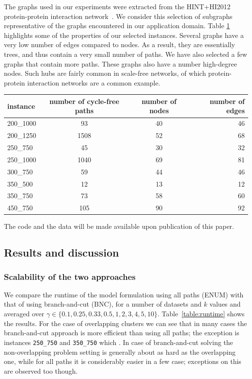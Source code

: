 \documentclass[conference]{IEEEtran}
\newcommand{\NDT}[1]{\todo[bordercolor=ghue,linecolor=ghue,color=ghue!40]{Tias: #1}}
\begin{document}
The graphs used in our experiments were extracted from the HINT+HI2012 protein-protein interaction network~\cite{das2012hint,yu2011next}. We consider this selection of subgraphs representative of the graphs encountered in our application domain. Table \ref{table:instanceInformation} highlights some of the properties of our selected instances. Several graphs have a very low number of edges compared to nodes. As a result, they are essentially trees, and thus contain a very small number of paths. 
We have also selected a few graphs that contain more paths. These graphs also have a number high-degree nodes. Such hubs are fairly common in scale-free networks, of which protein-protein interaction networks are a common example.


%


\begin{table}
\centering
\captionsetup{font=small}
\label{table:instanceInformation}
\begin{tabular}{|l c c r|}
\hline
instance & number of cycle-free paths & number of nodes & number of edges\\
\hline
200\_1000 & 93 & 40 & 46\\
200\_1250 & 1508 & 52 & 68\\
250\_750 & 45 & 30 & 32\\
250\_1000 & 1040 & 69 & 81\\
300\_750 & 59 & 44 & 46\\
350\_500 & 12 & 13 & 12\\
350\_750 & 73 & 58 & 60\\
450\_750 & 105 & 90 & 92\\
\hline
\end{tabular}
\end{table}


The code and the data will be made available upon publication of this paper.

\subsection{Results and discussion}
\subsubsection{Scalability of the two approaches}
We compare the runtime of the model formulation using all paths (ENUM) with that of using branch-and-cut (BNC), for a number of datasets and $k$ values and averaged over $\gamma\in\{0.1,0.25,0.33,0.5,1,2,3,4,5,10\}$. Table~\ref{table:runtime} shows the results. For the case of overlapping clusters we can see that in many cases the branch-and-cut approach is more efficient than using all paths; the exception is instances \texttt{250\_750} and \texttt{350\_750} which \NDT{TODO: explanation}. In case of branch-and-cut solving the non-overlapping problem setting is generally about as hard as the overlapping one, while for all paths it is considerably easier in a few case; exceptions on this are observed too though.
\end{document}
